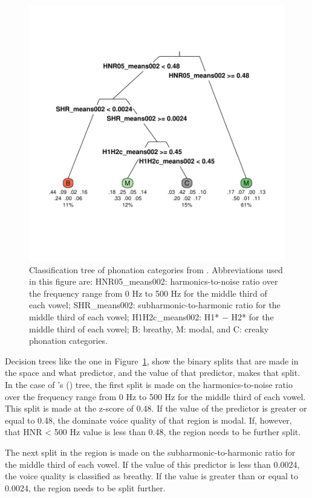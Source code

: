 \begin{figure}[!h]
    \centering
    \includegraphics[width = 0.9\linewidth]{images/keating_tree.pdf}
    \caption{Classification tree of phonation categories from \citet{keatingCrosslanguageAcousticSpace2023}. Abbreviations used in this figure are: {HNR05_means002}: harmonics-to-noise ratio over the frequency range from 0 Hz to 500 Hz for the middle third of each vowel; {SHR_means002}: subharmonic-to-harmonic ratio for the middle third of each vowel; {H1H2c_means002}: H1* − H2* for the middle third of each vowel; B: breathy, M: modal, and C: creaky phonation categories.}
    \label{fig:keating_tree}
\end{figure}

Decision trees like the one in Figure~\ref{fig:keating_tree}, show the binary splits that are made in the space and what predictor, and the value of that predictor, makes that split. In the case of \citeauthor{keatingCrosslanguageAcousticSpace2023}'s (\citeyear{keatingCrosslanguageAcousticSpace2023}) tree, the first split is made on the harmonics-to-noise ratio over the frequency range from 0 Hz to 500 Hz for the middle third of each vowel. This split is made at the z-score of 0.48. If the value of the predictor is greater or equal to 0.48, the dominate voice quality of that region is modal. If, however, that HNR < 500 Hz value is less than 0.48, the region needs to be further split. 

The next split in the region is made on the subharmonic-to-harmonic ratio for the middle third of each vowel. If the value of this predictor is less than 0.0024, the voice quality is classified as breathy. If the value is greater than or equal to 0.0024, the region needs to be split further.

